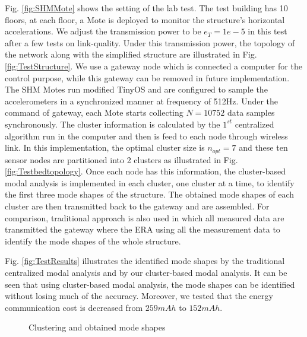 Fig. \ref{fig:SHMMote} shows the setting of the lab test. The test building has 10 floors, at each floor, a Mote is deployed to monitor the structure's horizontal accelerations. We adjust the transmission power to be \(e_T =1e-5\) in this test after a few tests on link-quality. Under this transmission power, the topology of the network along with the simplified structure are illustrated in Fig. \ref{fig:TestStructure}. We use a gateway node which is connected a computer for the control purpose, while this gateway can be removed in future implementation. The SHM Motes run modified TinyOS and are configured to sample the accelerometers in a synchronized manner at frequency of 512Hz. Under the command of gateway, each Mote starts collecting \(N = 10752\) data samples synchronously.  The cluster information is calculated by the \(1^{st}\) centralized algorithm run in the computer and then is feed to each node through wireless link. In this implementation, the optimal cluster size is \(n_{opt}=7\) and these ten sensor nodes are partitioned into 2 clusters as illustrated in Fig. \ref{fig:Testbedtopology}. Once each node has this information, the cluster-based modal analysis is implemented in each cluster, one cluster at a time, to identify the first three mode shapes of the structure.  The obtained mode shapes of each cluster are then transmitted back to the gateway and are assembled.  For comparison, traditional approach is also used in which all measured data are transmitted the gateway where the ERA using all the measurement data to identify the mode shapes of the whole structure.

Fig. \ref{fig:TestResults} illustrates the identified mode shapes by the traditional centralized modal analysis and by our cluster-based modal analysis. It can be seen that using cluster-based modal analysis, the mode shapes can be identified without losing much of the accuracy. Moreover, we tested that the energy communication cost is decreased from \(259mAh\) to \(152mAh\). 

\begin{figure}
\centering
\subfloat[Clustering using algorithm1]{\label{fig:Testbedcluster}
\texttt{[image: Testbedclustering.eps]}}
\subfloat[Mode shapes]{\label{fig:TestResults}
\texttt{[image: TestResults.eps]}}
\caption{Clustering and obtained mode shapes}
\label{fig:Clusteringwithmodeshapes}
\end{figure}



